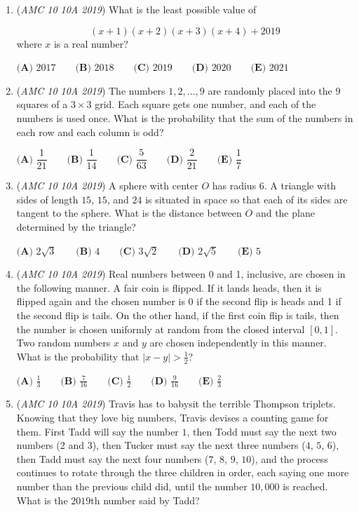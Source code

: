 \begin{enumerate}
 $\textbf{(A) } 13 \qquad\textbf{(B) } 14 \qquad\textbf{(C) } 15 \qquad\textbf{(D) } 16 \qquad\textbf{(E) } 17$


	\item (\textit{AMC 10 10A 2019}) What is the least possible value of

 \[(x+1)(x+2)(x+3)(x+4)+2019\]where $x$ is a real number?


 $\textbf{(A) } 2017 \qquad\textbf{(B) } 2018 \qquad\textbf{(C) } 2019 \qquad\textbf{(D) } 2020 \qquad\textbf{(E) } 2021$


	\item (\textit{AMC 10 10A 2019}) The numbers $1,2,\dots,9$ are randomly placed into the $9$ squares of a $3 \times 3$ grid. Each square gets one number, and each of the numbers is used once. What is the probability that the sum of the numbers in each row and each column is odd?


 $\textbf{(A) }\dfrac{1}{21}\qquad\textbf{(B) }\dfrac{1}{14}\qquad\textbf{(C) }\dfrac{5}{63}\qquad\textbf{(D) }\dfrac{2}{21}\qquad\textbf{(E) }\dfrac{1}{7}$


	\item (\textit{AMC 10 10A 2019}) A sphere with center $O$ has radius 6. A triangle with sides of length $15$, $15$, and $24$ is situated in space so that each of its sides are tangent to the sphere. What is the distance between $O$ and the plane determined by the triangle?


 $\textbf{(A) } 2\sqrt{3} \qquad \textbf{(B) }4 \qquad \textbf{(C) } 3\sqrt{2} \qquad \textbf{(D) } 2\sqrt{5} \qquad \textbf{(E) } 5$


	\item (\textit{AMC 10 10A 2019}) Real numbers between 0 and 1, inclusive, are chosen in the following manner. A fair coin is flipped. If it lands heads, then it is flipped again and the chosen number is 0 if the second flip is heads and 1 if the second flip is tails. On the other hand, if the first coin flip is tails, then the number is chosen uniformly at random from the closed interval $[0,1]$. Two random numbers $x$ and $y$ are chosen independently in this manner. What is the probability that $|x-y| > \frac{1}{2}$?


 $\textbf{(A) } \frac{1}{3} \qquad \textbf{(B) } \frac{7}{16} \qquad \textbf{(C) } \frac{1}{2} \qquad \textbf{(D) } \frac{9}{16} \qquad \textbf{(E) } \frac{2}{3}$


	\item (\textit{AMC 10 10A 2019}) Travis has to babysit the terrible Thompson triplets. Knowing that they love big numbers, Travis devises a counting game for them. First Tadd will say the number $1$, then Todd must say the next two numbers ($2$ and $3$), then Tucker must say the next three numbers  ($4$, $5$, $6$), then Tadd must say the next four numbers ($7$, $8$, $9$, $10$), and the process continues to rotate through the three children in order, each saying one more number than the previous child did, until the number $10,000$ is reached. What is the $2019$th number said by Tadd?



\end{enumerate}
